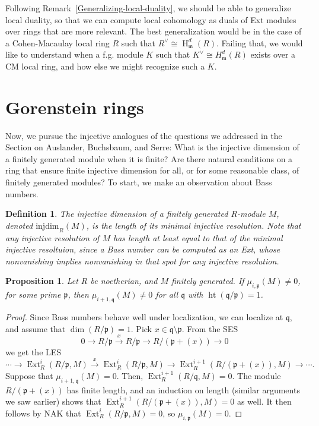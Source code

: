 \documentclass[11pt]{book}
\newtheorem{proposition}[theorem]{Proposition}
\newtheorem{definition}[theorem]{Definition}
\numberwithin{equation}{section}
\numberwithin{theorem}{chapter}
\theoremstyle{definition}
\newtheorem*{basic properties}{Basic Properties}
\newtheorem*{Important Remark}{Important Remark}
\theoremstyle{remark}
\newcommand{\m}{\mathfrak{m}}
\newcommand{\p}{\mathfrak{p}}
\newcommand{\q}{\mathfrak{q}}
\newcommand{\Ext}{\operatorname{Ext}}
\newcommand{\height}{\operatorname{ht}}
\renewcommand{\dim}{\operatorname{dim}}
\renewcommand{\height}{\operatorname{ht}}
\renewcommand{\H}{\operatorname{H}}
\begin{document}
Following Remark~\ref{Generalizing-local-duality}, we should be able to generalize local duality, so that we can compute local cohomology as duals of Ext modules over rings that are more relevant. The best generalization would be in the case of a Cohen-Macaulay local ring $R$ such that $R^{\vee}\cong \H^d_{\m}(R)$. Failing that, we would like to understand when a f.g. module $K$ such that $K^\vee\cong H^d_{\m}(R)$ exists over a CM local ring, and how else we might recognize such a $K$.







\section{Gorenstein rings}

Now, we pursue the injective analogues of the questions we addressed in the Section on Auslander, Buchsbaum, and Serre: What is the injective dimension of a finitely generated module when it is finite? Are there natural conditions on a ring that ensure finite injective dimension for all, or for some reasonable class, of finitely generated modules? To start, we make an observation about Bass numbers.

\begin{definition}
	The \emph{injective dimension} of a finitely generated $R$-module $M$, denoted $\mathrm{injdim}_R(M)$, is the length of its minimal injective resolution.  Note that any injective resolution of $M$ has length at least equal to that of the minimal injective resoltuion, since a Bass number can be computed as an Ext, whose nonvanishing implies nonvanishing in that spot for any injective resolution.
\end{definition}

\begin{proposition}
Let $R$ be noetherian, and $M$ finitely generated. If $\mu_{i,\p}(M)\neq 0$, for some prime $\p$, then $\mu_{i+1,\q}(M)\neq 0$ for all $\q$ with $\height(\q/\p)=1$.
\end{proposition}
\begin{proof}
Since Bass numbers behave well under localization, we can localize at $\q$, and assume that $\dim(R/\p)=1$. Pick $x\in \q \setminus \p$. From the SES
\[0 \to R/\p \stackrel{x}{\longrightarrow}  R/\p \to R/(\p+(x)) \to 0  \]
we get the LES
\[\cdots \to \Ext^i_R(R/\p,M) \stackrel{x}{\longrightarrow} \Ext^i_R(R/\p,M) \to \Ext^{i+1}_R(R/(\p+(x)),M) \to \cdots. \]
Suppose that $\mu_{i+1,\q}(M)=0$. Then, $\Ext^{i+1}_R(R/\q,M)=0$. The module $R/(\p+(x))$ has finite length, and an induction on length (similar arguments we saw earlier) shows that $\Ext^{i+1}_R(R/(\p+(x)),M)=0$ as well. It then follows by NAK that $\Ext^i_R(R/\p,M)=0$, so $\mu_{i,\p}(M)=0$.
\end{proof}
\end{document}
